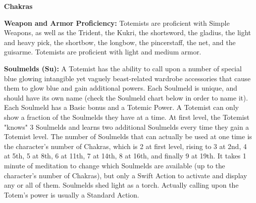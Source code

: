 \begin{extraclasstable}{\textbf{Chakras}}
\end{extraclasstable}

\classfeatures

\textbf{Weapon and Armor Proficiency:} Totemists are proficient with Simple Weapons, as well as the Trident, the Kukri, the shortsword, the gladius, the light and heavy pick, the shortbow, the longbow, the pincerstaff, the net, and the guisarme. Totemists are proficient with light and medium armor.

\textbf{Soulmelds (Su):} A Totemist has the ability to call upon a number of special blue glowing intangible yet vaguely beast-related wardrobe accessories that cause them to glow blue and gain additional powers. Each Soulmeld is unique, and should have its own name (check the Soulmeld chart below in order to name it). Each Soulmeld has a Basic bonus and a Totemic Power. A Totemist can only show a fraction of the Soulmelds they have at a time. At first level, the Totemist "knows" 3 Soulmelds and learns two additional Soulmelds every time they gain a Totemist level. The number of Soulmelds that can actually be used at one time is the character's number of Chakras, which is 2 at first level, rising to 3 at 2nd, 4 at 5th, 5 at 8th, 6 at 11th, 7 at 14th, 8 at 16th, and finally 9 at 19th. It takes 1 minute of meditation to change which Soulmelds are available (up to the character's number of Chakras), but only a Swift Action to activate and display any or all of them. Soulmelds shed light as a torch. Actually calling upon the Totem's power is usually a Standard Action.


